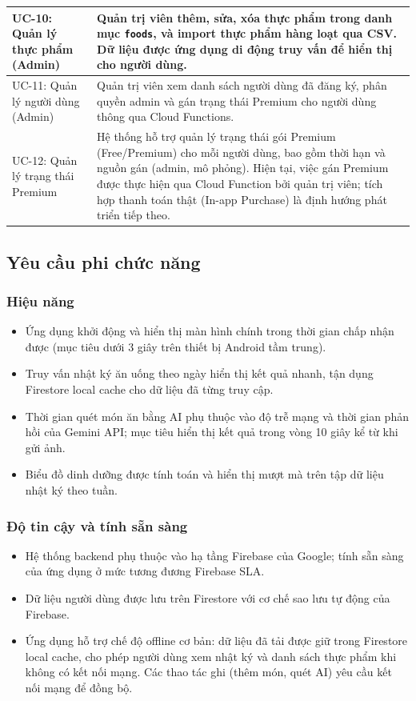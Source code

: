 \begin{longtable}{|p{3cm}|p{11cm}|}
    UC-10: Quản lý thực phẩm (Admin) & Quản trị viên thêm, sửa, xóa thực phẩm trong danh mục \texttt{foods}, và import thực phẩm hàng loạt qua CSV. Dữ liệu được ứng dụng di động truy vấn để hiển thị cho người dùng. \\
    \hline
    UC-11: Quản lý người dùng (Admin) & Quản trị viên xem danh sách người dùng đã đăng ký, phân quyền admin và gán trạng thái Premium cho người dùng thông qua Cloud Functions. \\
    \hline
    UC-12: Quản lý trạng thái Premium & Hệ thống hỗ trợ quản lý trạng thái gói Premium (Free/Premium) cho mỗi người dùng, bao gồm thời hạn và nguồn gán (admin, mô phỏng). Hiện tại, việc gán Premium được thực hiện qua Cloud Function bởi quản trị viên; tích hợp thanh toán thật (In-app Purchase) là định hướng phát triển tiếp theo. \\
    \hline
\end{longtable}

\subsection{Yêu cầu phi chức năng}

\subsubsection{Hiệu năng}
\begin{itemize}
    \item Ứng dụng khởi động và hiển thị màn hình chính trong thời gian chấp nhận được (mục tiêu dưới 3 giây trên thiết bị Android tầm trung).
    \item Truy vấn nhật ký ăn uống theo ngày hiển thị kết quả nhanh, tận dụng Firestore local cache cho dữ liệu đã từng truy cập.
    \item Thời gian quét món ăn bằng AI phụ thuộc vào độ trễ mạng và thời gian phản hồi của Gemini API; mục tiêu hiển thị kết quả trong vòng 10 giây kể từ khi gửi ảnh.
    \item Biểu đồ dinh dưỡng được tính toán và hiển thị mượt mà trên tập dữ liệu nhật ký theo tuần.
\end{itemize}

\subsubsection{Độ tin cậy và tính sẵn sàng}
\begin{itemize}
    \item Hệ thống backend phụ thuộc vào hạ tầng Firebase của Google; tính sẵn sàng của ứng dụng ở mức tương đương Firebase SLA.
    \item Dữ liệu người dùng được lưu trên Firestore với cơ chế sao lưu tự động của Firebase.
    \item Ứng dụng hỗ trợ chế độ offline cơ bản: dữ liệu đã tải được giữ trong Firestore local cache, cho phép người dùng xem nhật ký và danh sách thực phẩm khi không có kết nối mạng. Các thao tác ghi (thêm món, quét AI) yêu cầu kết nối mạng để đồng bộ.
\end{itemize}

